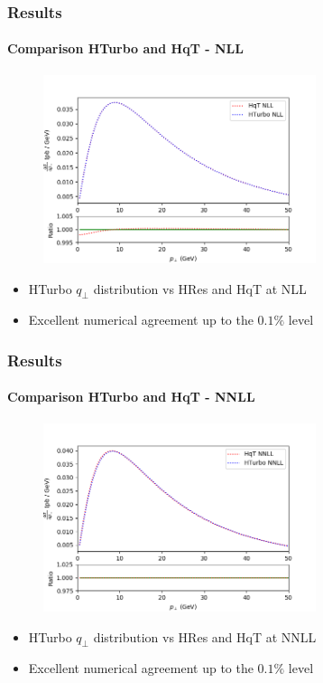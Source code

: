 \documentclass[aspectratio=43]{beamer}
\begin{document}
\begin{frame}

	\frametitle{Results}
	\framesubtitle{Comparison HTurbo and HqT - NLL}
	
	\begin{figure}
		\includegraphics[width = 8cm]{plots/part_III/hturbo_NLL.png}
	\end{figure}

	\begin{itemize}
		\item HTurbo $q_{\perp}$ distribution vs HRes and HqT at NLL
		\item Excellent numerical agreement up to the $0.1\%$ level
	\end{itemize}

\end{frame}

\begin{frame}

	\frametitle{Results}
	\framesubtitle{Comparison HTurbo and HqT - NNLL}
	
	\begin{figure}
		\includegraphics[width = 8cm]{plots/part_III/hturbo_NNLL_f2only2.png}
	\end{figure}
	
	\begin{itemize}
		\item HTurbo $q_{\perp}$ distribution vs HRes and HqT at NNLL
		\item Excellent numerical agreement up to the $0.1\%$ level
\end{itemize}

\end{frame}
\end{document}

